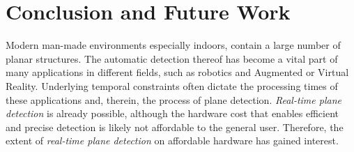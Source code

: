 \documentclass[main.tex]{subfiles}
\begin{document}
\chapter{Conclusion and Future Work}
\label{chap:concl}

Modern man-made environments especially indoors, contain a large number of planar structures. 
The automatic detection thereof has become a vital part of many applications in different fields, such as robotics and Augmented or Virtual Reality. Underlying temporal constraints often dictate the processing times of these applications and, therein, the process of plane detection. \textit{Real-time plane detection} is already possible, although the hardware cost that enables efficient and precise detection is likely not affordable to the general user. 
Therefore, the extent of \textit{real-time plane detection} on affordable hardware has gained interest.

\end{document}
